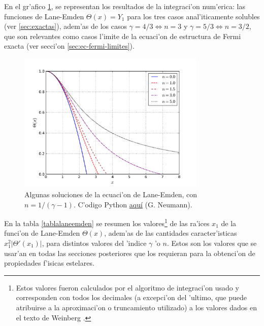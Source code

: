 En el gr'afico \ref{graficolane-emden}, se representan los resultados de la integraci'on num'erica: las funciones de Lane-Emden $\Theta(x)=Y_1$ para los tres casos anal'iticamente solubles (ver \ref{sec:exactas}), adem'as de los casos $\gamma=4/3\Leftrightarrow n=3$ y $\gamma=5/3\Leftrightarrow n=3/2$, que son relevantes como casos l'imite de la ecuaci'on de estructura de Fermi exacta (ver secci'on \ref{sec:ec-fermi-limites}).
\begin{figure}[H]
\centering
\includegraphics[angle=0,width=0.8\textwidth]{fig/fig-Lane-Emden.pdf}
\caption{Algunas soluciones de la ecuaci'on de Lane-Emden, con $n=1/(\gamma-1)$. C'odigo Python \href{https://github.com/gfrubi/GR/blob/master/figuras-editables/fig-Lane_Emden.py}{aqu\'i} (G. Neumann).}
\label{graficolane-emden}
\end{figure}

En la tabla \ref{tablalaneemden} se resumen los valores\footnote{Estos valores fueron calculados por el algoritmo de integraci'on usado y corresponden con todos los decimales (a excepci'on del 'ultimo, que puede atribuirse a la aproximaci'on o truncamiento utilizado) a los valores dados en el texto de Weinberg \cite{Weinberg72}.} de las ra'ices $x_1$ de la funci'on de Lane-Emden $\Theta(x)$, adem'as de las cantidades caracter'isticas $x_1^2\left|\Theta'(x_1)\right|$, para distintos valores del 'indice $\gamma$ 'o $n$. Estos son los valores que se usar'an en todas las secciones posteriores que los requieran para la obtenci'on de propiedades f'isicas estelares.

